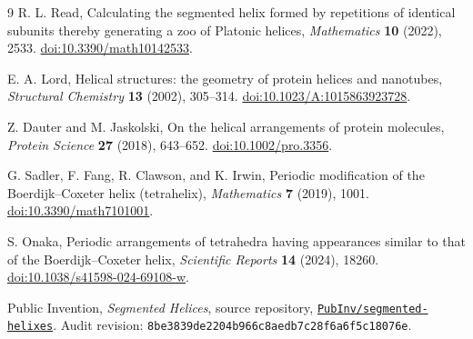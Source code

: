 \documentclass[11pt]{article}
\theoremstyle{definition}
\begin{document}
{\small
\begin{thebibliography}{9}
R. L. Read, Calculating the segmented helix formed by repetitions of identical
subunits thereby generating a zoo of Platonic helices,
\emph{Mathematics} \textbf{10} (2022), 2533.
\href{https://doi.org/10.3390/math10142533}{doi:10.3390/math10142533}.

E. A. Lord, Helical structures: the geometry of protein helices and nanotubes,
\emph{Structural Chemistry} \textbf{13} (2002), 305--314.
\href{https://doi.org/10.1023/A:1015863923728}{doi:10.1023/A:1015863923728}.

Z. Dauter and M. Jaskolski, On the helical arrangements of protein molecules,
\emph{Protein Science} \textbf{27} (2018), 643--652.
\href{https://doi.org/10.1002/pro.3356}{doi:10.1002/pro.3356}.

G. Sadler, F. Fang, R. Clawson, and K. Irwin,
Periodic modification of the Boerdijk--Coxeter helix (tetrahelix),
\emph{Mathematics} \textbf{7} (2019), 1001.
\href{https://doi.org/10.3390/math7101001}{doi:10.3390/math7101001}.

S. Onaka, Periodic arrangements of tetrahedra having appearances similar to
that of the Boerdijk--Coxeter helix,
\emph{Scientific Reports} \textbf{14} (2024), 18260.
\href{https://doi.org/10.1038/s41598-024-69108-w}{doi:10.1038/s41598-024-69108-w}.

Public Invention, \emph{Segmented Helices}, source repository,
\href{https://github.com/PubInv/segmented-helixes}{\texttt{PubInv/segmented-helixes}}.
Audit revision: \texttt{8be3839de2204b966c8aedb7c28f6a6f5c18076e}.
\end{thebibliography}
}
\end{document}
